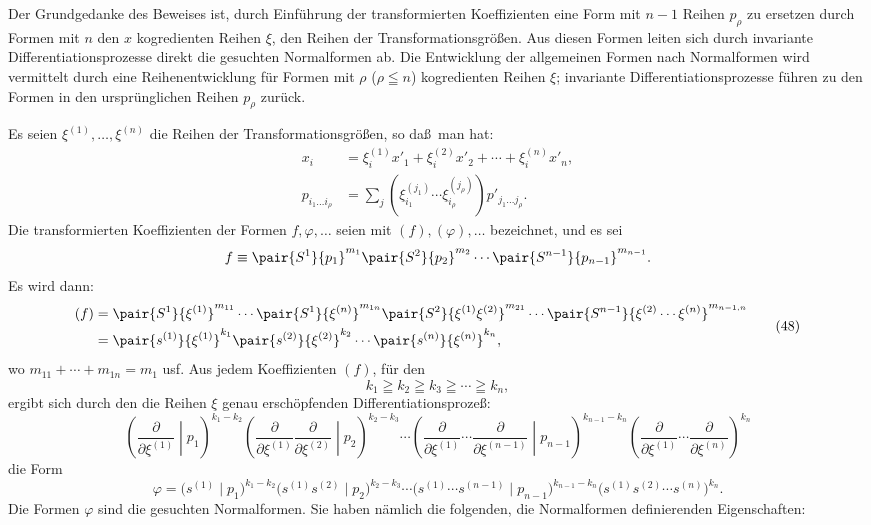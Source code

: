 Der Grundgedanke des Beweises ist, durch Einf\"uhrung der transformierten Koeffizienten eine Form mit $n-1$ Reihen $p_\rho$ zu ersetzen durch Formen mit $n$ den $x$ kogredienten Reihen $\xi$, den Reihen der Transformationsgr\"o\ss en. Aus diesen Formen leiten sich durch invariante Differentiationsprozesse direkt die gesuchten Normalformen ab. Die Entwicklung der allgemeinen Formen nach Normalformen wird vermittelt durch eine Reihenentwicklung f\"ur Formen mit $\rho$ ($\rho\leqq n$) kogredienten Reihen $\xi$; invariante Differentiationsprozesse f\"uhren zu den Formen in den urspr\"unglichen Reihen $p_\rho$ zur\"uck.

Es seien $\xi^{(1)},\ldots,\xi^{(n)}$ die Reihen der Transformationsgr\"o\ss en, so da\ss\ man hat:
\begin{equation}
\begin{aligned}
x_i&=\xi_i^{(1)}x'_1+\xi_i^{(2)}x'_2+\cdots+\xi_i^{(n)}x'_n,\\
p_{i_1\ldots i_\rho}&=\sum_j(\xi_{i_1}^{(j_1)}\cdots \xi_{i_\rho}^{(j_\rho)})p'_{j_1\ldots j_\rho}.
\end{aligned}
\tag{47}
\end{equation}
Die transformierten Koeffizienten der Formen $f,\varphi,\ldots$ seien mit $(f),(\varphi),\ldots$ bezeichnet, und es sei
\[
 f\equiv\pair{S^1}{p_1}^{m_1}\pair{S^2}{p_2}^{m_2}\cdots\pair{S^{n-1}}{p_{n-1}}^{m_{n-1}}.
\]
Es wird dann:
\begin{equation}
\begin{aligned}
(f)&=\pair{S^1}{\xi^{(1)}}^{m_{11}}\cdots\pair{S^1}{\xi^{(n)}}^{m_{1n}}
\pair{S^2}{\xi^{(1)}\xi^{(2)}}^{m_{21}}\cdots
\pair{S^{n-1}}{\xi^{(2)}\cdots\xi^{(n)}}^{m_{n-1,n}}\\
&=\pair{s^{(1)}}{\xi^{(1)}}^{k_1}\pair{s^{(2)}}{\xi^{(2)}}^{k_2}\cdots\pair{s^{(n)}}{\xi^{(n)}}^{k_n},
\end{aligned}
\tag{48}
\end{equation}
wo $m_{11}+\cdots+m_{1n}=m_1$ usf. Aus jedem Koeffizienten $(f)$, f\"ur den
\begin{equation}
 k_1\geqq k_2\geqq k_3\geqq\cdots\geqq k_n,
\tag{49}
\end{equation}
ergibt sich durch den die Reihen $\xi$ genau ersch\"opfenden Differentiationsproze\ss:
\begin{equation}
\left(\frac{\partial}{\partial\xi^{(1)}}\middle|p_1\right)^{k_1-k_2}
\left(\frac{\partial}{\partial\xi^{(1)}}\frac{\partial}{\partial\xi^{(2)}}\middle|p_2\right)^{k_2-k_3}
\cdots
\left(\frac{\partial}{\partial\xi^{(1)}}\cdots\frac{\partial}{\partial\xi^{(n-1)}}\middle|p_{n-1}\right)^{k_{n-1}-k_n}
\left(\frac{\partial}{\partial\xi^{(1)}}\cdots\frac{\partial}{\partial\xi^{(n)}}\right)^{k_n}
\tag{50}
\end{equation}
die Form
\begin{equation}
 \varphi=\bigl(s^{(1)}\mid p_1\bigr)^{k_1-k_2}
 \bigl(s^{(1)}s^{(2)}\mid p_2\bigr)^{k_2-k_3}\cdots
 \bigl(s^{(1)}\cdots s^{(n-1)}\mid p_{n-1}\bigr)^{k_{n-1}-k_n}
 \bigl(s^{(1)}s^{(2)}\cdots s^{(n)}\bigr)^{k_n}.
\tag{51}
\end{equation}
Die Formen $\varphi$ sind die gesuchten Normalformen. Sie haben n\"amlich die folgenden, die Normalformen definierenden Eigenschaften:

